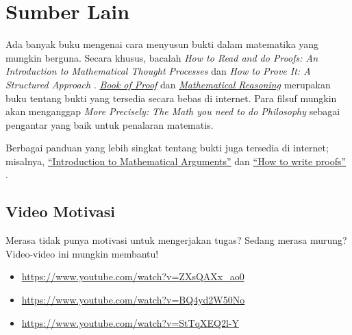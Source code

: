 \documentclass[../../../include/open-logic-section]{subfiles}
\begin{document}

\section{Sumber Lain}

Ada banyak buku mengenai cara menyusun bukti dalam matematika yang mungkin
berguna. Secara khusus, bacalah \emph{How to Read and do Proofs: An
Introduction to Mathematical Thought Processes} \citep{Solow2013} dan
\emph{How to Prove It: A Structured Approach} \citep{Velleman2019}.
\href{http://www.people.vcu.edu/~rhammack/BookOfProof/BookOfProof.pdf}{\emph{Book
of Proof}} \citep{Hammack2013} dan
\href{https://scholarworks.gvsu.edu/books/7/}{\emph{Mathematical
Reasoning}} \citep{Sandstrum2019} merupakan buku tentang bukti yang tersedia
secara bebas di internet. Para filsuf mungkin akan menganggap
\emph{More Precisely: The Math you need to do Philosophy}
\citep{Steinhart2018} sebagai pengantar yang baik untuk penalaran matematis.

Berbagai panduan yang lebih singkat tentang bukti juga tersedia di internet;
misalnya,
\href{https://math.berkeley.edu/~hutching/teach/proofs.pdf}{``Introduction
  to Mathematical Arguments''} \citep{Hutchings2003} dan
\href{https://eugeniacheng.com/wp-content/uploads/2017/02/cheng-proofguide.pdf}{``How to
  write proofs''} \citep{Cheng2004}.

\subsection{Video Motivasi}

Merasa tidak punya motivasi untuk mengerjakan tugas? Sedang merasa murung?
Video-video ini mungkin membantu!

\begin{itemize}
\item \url{https://www.youtube.com/watch?v=ZXsQAXx_ao0}
\item \url{https://www.youtube.com/watch?v=BQ4yd2W50No}
\item \url{https://www.youtube.com/watch?v=StTqXEQ2l-Y}
\end{itemize}
\end{document}
